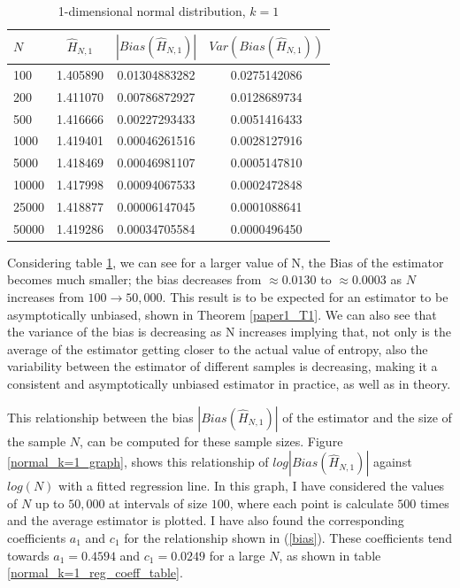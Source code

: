 \documentclass{article}
\begin{document}
\begin{table}
\caption{1-dimensional normal distribution, $k=1$} \label{normal_k=1_table}
\begin{center}
\begin{tabular}{| l | c c c|} 
\toprule
$N$ & $\hat{H}_{N, 1}$ & $|Bias(\hat{H}_{N, 1})|$ & $Var(Bias(\hat{H}_{N, 1}))$ \\
\midrule[1pt]
100     & 1.405890     & 0.01304883282     & 0.0275142086  \\
200     & 1.411070     & 0.00786872927     & 0.0128689734  \\
500     & 1.416666     & 0.00227293433     & 0.0051416433  \\
1000    & 1.419401     & 0.00046261516     & 0.0028127916  \\
5000    & 1.418469     & 0.00046981107     & 0.0005147810  \\
10000   & 1.417998     & 0.00094067533     & 0.0002472848  \\
25000   & 1.418877     & 0.00006147045     & 0.0001088641  \\
50000   & 1.419286     & 0.00034705584     & 0.0000496450  \\
\hline
\end{tabular}
\end{center}
\end{table}

Considering table \ref{normal_k=1_table}, we can see for a larger value of N, the Bias of the estimator becomes much smaller; the bias decreases from $\approx 0.0130$ to $\approx 0.0003$ as $N$ increases from $100 \to 50,000$. This result is to be expected for an estimator to be asymptotically unbiased, shown in Theorem \ref{paper1_T1}. We can also see that the variance of the bias is decreasing as N increases implying that, not only is the average of the estimator getting closer to the actual value of entropy, also the variability between the estimator of different samples is decreasing, making it a consistent and asymptotically unbiased estimator in practice, as well as in theory.

This relationship between the bias $|Bias(\hat{H}_{N, 1})|$ of the estimator and the size of the sample $N$, can be computed for these sample sizes. Figure \ref{normal_k=1_graph}, shows this relationship of $log|Bias(\hat{H}_{N, 1})|$ against $log(N)$ with a fitted regression line. In this graph, I have considered the values of $N$ up to $50,000$ at intervals of size $100$, where each point is calculate $500$ times and the average estimator is plotted. I have also found the corresponding coefficients $a_{1}$ and $c_{1}$ for the relationship shown in (\ref{bias}). These coefficients tend towards $a_{1} = 0.4594$ and $c_{1} = 0.0249$ for a large $N$, as shown in table \ref{normal_k=1_reg_coeff_table}. 
 
\end{document}
